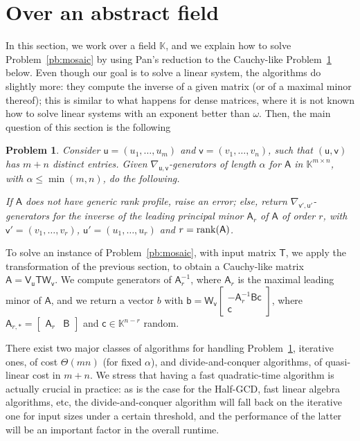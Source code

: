\documentclass[sigconf]{acmart}
\newcommand{\vb}{\ensuremath{\mathsf{b}}}
\newcommand{\vc}{\ensuremath{\mathsf{c}}}
\newcommand{\vu}{\ensuremath{\mathsf{u}}}
\newcommand{\vv}{\ensuremath{\mathsf{v}}}
\newcommand{\mA}{\ensuremath{\mathsf{A}}}
\newcommand{\mB}{\ensuremath{\mathsf{B}}}
\newcommand{\mT}{\ensuremath{\mathsf{T}}}
\newcommand{\mV}{\ensuremath{\mathsf{V}}}
\newcommand{\mW}{\ensuremath{\mathsf{W}}}
\newcommand{\K}{\ensuremath{\mathbb{K}}}
\newtheorem{pbm}{Problem}
\theoremstyle{acmdefinition}
\begin{document}
\section{Over an abstract field}\label{sec:abstract}

In this section, we work over a field $\K$, and we explain how to
solve Problem~\ref{pb:mosaic} by using Pan's reduction to the
Cauchy-like Problem~\ref{pb:cauchy} below. Even though our goal is to
solve a linear system, the algorithms do slightly more: they compute
the inverse of a given matrix (or of a maximal minor thereof); this is
similar to what happens for dense matrices, where it is not known how
to solve linear systems with an exponent better than $\omega$.
Then, the main question of this section is the following 
%
%
\begin{pbm}\label{pb:cauchy}
  Consider $\vu=(u_1,\dots,u_m)$ and $\vv=(v_1,\dots,v_n)$,
  such that $(\vu,\vv)$ has $m+n$ distinct entries. Given
  $\nabla_{\vu,\vv}$-generators of length $\alpha$ for $\mA$
  in $\K^{m \times n}$, with $\alpha \le \min(m,n)$, do the following.

  If $\mA$ does not have generic rank profile, raise an error;
  else, return $\nabla_{\vv',\vu'}$-generators for the inverse
    of the leading principal minor $\mA_r$ of $\mA$ of order $r$, with
    $\vv'=(v_1,\dots,v_r)$, $\vu'=(u_1,\dots,u_r)$ and
    $r={\rm rank}(\mA)$.
\end{pbm}
%
To solve an instance of Problem~\ref{pb:mosaic}, with input matrix
$\mT$, we apply the transformation of the previous section, to obtain
a Cauchy-like matrix $\mA = \mV_\vu \mT \mW_{\vv}$. We compute
generators of $\mA_{r}^{-1}$, where $\mA_r$ is the maximal leading minor
of $\mA$, and we return a vector $b$ with
$\vb=\mW_{\vv}
\left[\begin{smallmatrix} 
-\mA_r^{-1}  \mB \vc \\ 
\vc
\end{smallmatrix}\right]$,
where 
%
$\mA_{r,\ast}=\begin{bmatrix}
    \mA_r & \mB
  \end{bmatrix}$ 
and $\vc \in \K^{n-r}$ random.

There exist two major classes of algorithms for handling
Problem~\ref{pb:cauchy}, iterative ones, of cost  $\Theta(mn)$
(for fixed $\alpha$), and  divide-and-conquer
algorithms, of quasi-linear cost in $m+n$. We stress that having a
fast quadratic-time algorithm is actually crucial in practice: as is
the case for the Half-GCD, fast linear algebra algorithms, etc, the
divide-and-conquer  algorithm will fall back on the iterative one for input
sizes under a certain threshold, and the performance of the latter
will be an important factor in the overall runtime.
\end{document}
